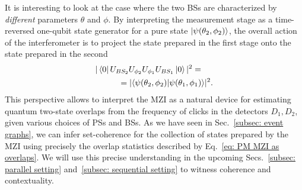 \documentclass[a4paper,twocolumn,11pt,accepted=2024-01-17]{quantumarticle}
\begin{document}
It is interesting to look at the case where the two BSs are characterized by \textit{different} parameters $\theta$ and $\phi$. By interpreting the measurement stage as a time-reversed one-qubit state generator for a pure state $\ket{\psi(\theta_2,\phi_2)}$, the overall action of the interferometer is to project the state prepared in the first stage onto the state prepared in the second
\begin{align}
    |\bra{0} U_{BS_{2}}U_{\phi_2}U_{\phi_1}U_{BS_1}\ket{0}|^2 =\hspace{0.5cm}\nonumber\\= |\langle \psi(\theta_2,\phi_2)\vert \psi(\theta_1,\phi_1) \rangle|^2.\label{eq: PM MZI as overlaps}
\end{align}
This perspective allows to interpret the MZI as a natural device for estimating quantum two-state overlaps from the frequency of clicks in the detectors $D_1, D_2$, given various choices of PSs and BSs. { As we have seen in Sec.~\ref{subsec: event graphs}, we can infer set-coherence for the collection of states prepared by the MZI using precisely the overlap statistics described by Eq.~\eqref{eq: PM MZI as overlaps}. We will use this precise understanding in the upcoming Secs.~\ref{subsec: parallel setting} and~\ref{subsec: sequential setting} to witness coherence and contextuality.}
\end{document}
